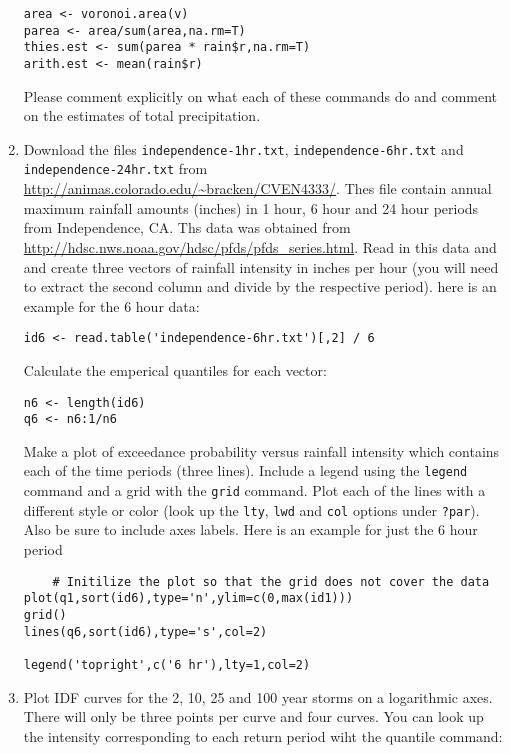 \documentclass[11pt]{article}
\begin{document}
\begin{enumerate}
\begin{verbatim}
area <- voronoi.area(v)
parea <- area/sum(area,na.rm=T)
thies.est <- sum(parea * rain$r,na.rm=T)
arith.est <- mean(rain$r)
\end{verbatim}
Please comment explicitly on what each of these commands do and comment on the estimates of total precipitation.  


\item Download the files \texttt{independence-1hr.txt}, \texttt{independence-6hr.txt} and \texttt{independence-24hr.txt} from \url{http://animas.colorado.edu/~bracken/CVEN4333/}.  Thes file contain annual maximum rainfall amounts (inches) in 1 hour, 6 hour and 24 hour periods from Independence, CA.  Ths data was obtained from \url{http://hdsc.nws.noaa.gov/hdsc/pfds/pfds_series.html}. Read in this data and and create three vectors of rainfall intensity in inches per hour (you will need to extract the second column and divide by the respective period).  here is an example for the 6 hour data:

\begin{verbatim}
id6 <- read.table('independence-6hr.txt')[,2] / 6
\end{verbatim}

Calculate the emperical quantiles for each vector:

\begin{verbatim}
n6 <- length(id6)
q6 <- n6:1/n6
\end{verbatim}

Make a plot of exceedance probability versus rainfall intensity which contains each of the time periods (three lines). Include a legend using the \texttt{legend} command and a grid with the \texttt{grid} command. Plot each of the lines with a different style or color (look up the \texttt{lty}, \texttt{lwd} and \texttt{col} options under \texttt{?par}). Also be sure to include axes labels.  Here is an example for just the 6 hour period

\begin{verbatim}
	# Initilize the plot so that the grid does not cover the data
plot(q1,sort(id6),type='n',ylim=c(0,max(id1)))
grid()
lines(q6,sort(id6),type='s',col=2)

legend('topright',c('6 hr'),lty=1,col=2)
\end{verbatim}

\item Plot IDF curves for the 2, 10, 25 and 100 year storms on a logarithmic axes.  There will only be three points per curve and four curves. You can look up the intensity corresponding to each return period wiht the quantile command:


\end{enumerate}
\end{document}
